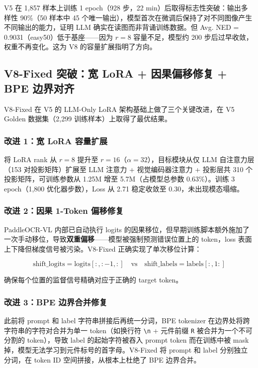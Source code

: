 V5 在 1,857 样本上训练 1 epoch（928 步，22 min）后取得标志性突破：输出多样性 90\%（50 样本中 45 个唯一输出），模型首次在微调后保持了对不同图像产生不同输出的能力，证明 LLM 确实在读图而非背诵训练数据。但 Avg. NED = 0.9031（easy50）低于基座——因为 $r=8$ 容量不足，模型约 200 步后过早收敛，权重不再变化。这为 V8 的容量扩展指明了方向。

\subsection{V8-Fixed 突破：宽 LoRA + 因果偏移修复 + BPE 边界对齐}

V8-Fixed 在 V5 的 LLM-Only LoRA 架构基础上做了三个关键改进，在 V5 Golden 数据集（2,299 训练样本）上取得了最优结果。

\subsubsection{改进 1：宽 LoRA 容量扩展}

将 LoRA rank 从 $r=8$ 提升至 $r=16$（$\alpha=32$），目标模块从仅 LLM 自注意力层（153 对投影矩阵）扩展至 LLM 注意力 + 视觉编码器注意力 + 投影层共 310 个投影矩阵，可训练参数从 1.25M 增至 5.7M（占模型总参数 0.63\%）。训练 3 epoch（1,800 优化器步数），Loss 从 2.71 稳定收敛至 0.30，未出现模态塌缩。

\subsubsection{改进 2：因果 1-Token 偏移修复}

PaddleOCR-VL 内部已自动执行 logits 的因果移位，但早期训练脚本额外施加了一次手动移位，导致\textbf{双重偏移}——模型被强制预测错误位置上的 token，loss 表面上下降但梯度信号被污染。V8-Fixed 正确实现了单次移位计算：

\begin{equation}
\text{shift\_logits} = \text{logits}[:, :-1, :] \quad \text{vs} \quad \text{shift\_labels} = \text{labels}[:, 1:]
\end{equation}

确保每个位置的监督信号精确对应于正确的 target token。

\subsubsection{改进 3：BPE 边界合并修复}

此前将 prompt 和 label 字符串拼接后再统一分词，BPE tokenizer 在边界处将跨字符串的字符对合并为单一 token（如换行符 \texttt{\textbackslash n} + 元件前缀 \texttt{R} 被合并为一个不可分割的 token），导致 label 的起始字符被吞入 prompt token 而在训练中被 mask 掉，模型无法学习到元件标号的首字母。V8-Fixed 将 prompt 和 label 分别独立分词，在 token ID 空间拼接，从根本上杜绝了 BPE 边界合并。

